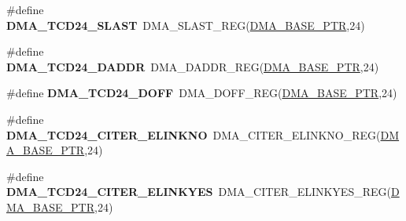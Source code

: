\begin{DoxyCompactItemize}
\item 
\hypertarget{group___d_m_a___register___accessor___macros_ga07c09cae7af5e9d503544a92e534ae4f}{}\#define {\bfseries D\+M\+A\+\_\+\+T\+C\+D24\+\_\+\+S\+L\+A\+S\+T}~D\+M\+A\+\_\+\+S\+L\+A\+S\+T\+\_\+\+R\+E\+G(\hyperlink{group___d_m_a___peripheral_ga6997fbc1b1973e9f27170217a3bd6f22}{D\+M\+A\+\_\+\+B\+A\+S\+E\+\_\+\+P\+T\+R},24)\label{group___d_m_a___register___accessor___macros_ga07c09cae7af5e9d503544a92e534ae4f}

\item 
\hypertarget{group___d_m_a___register___accessor___macros_gad238f6dc2d956a9093c0cf97062d473c}{}\#define {\bfseries D\+M\+A\+\_\+\+T\+C\+D24\+\_\+\+D\+A\+D\+D\+R}~D\+M\+A\+\_\+\+D\+A\+D\+D\+R\+\_\+\+R\+E\+G(\hyperlink{group___d_m_a___peripheral_ga6997fbc1b1973e9f27170217a3bd6f22}{D\+M\+A\+\_\+\+B\+A\+S\+E\+\_\+\+P\+T\+R},24)\label{group___d_m_a___register___accessor___macros_gad238f6dc2d956a9093c0cf97062d473c}

\item 
\hypertarget{group___d_m_a___register___accessor___macros_ga7a62dbbc9e3ac5c19ec1e69d0d47efe7}{}\#define {\bfseries D\+M\+A\+\_\+\+T\+C\+D24\+\_\+\+D\+O\+F\+F}~D\+M\+A\+\_\+\+D\+O\+F\+F\+\_\+\+R\+E\+G(\hyperlink{group___d_m_a___peripheral_ga6997fbc1b1973e9f27170217a3bd6f22}{D\+M\+A\+\_\+\+B\+A\+S\+E\+\_\+\+P\+T\+R},24)\label{group___d_m_a___register___accessor___macros_ga7a62dbbc9e3ac5c19ec1e69d0d47efe7}

\item 
\hypertarget{group___d_m_a___register___accessor___macros_gae4554e5077ad28d574bb069bc1da7f85}{}\#define {\bfseries D\+M\+A\+\_\+\+T\+C\+D24\+\_\+\+C\+I\+T\+E\+R\+\_\+\+E\+L\+I\+N\+K\+N\+O}~D\+M\+A\+\_\+\+C\+I\+T\+E\+R\+\_\+\+E\+L\+I\+N\+K\+N\+O\+\_\+\+R\+E\+G(\hyperlink{group___d_m_a___peripheral_ga6997fbc1b1973e9f27170217a3bd6f22}{D\+M\+A\+\_\+\+B\+A\+S\+E\+\_\+\+P\+T\+R},24)\label{group___d_m_a___register___accessor___macros_gae4554e5077ad28d574bb069bc1da7f85}

\item 
\hypertarget{group___d_m_a___register___accessor___macros_ga88a7054f89a806efff58d69119fbdd4c}{}\#define {\bfseries D\+M\+A\+\_\+\+T\+C\+D24\+\_\+\+C\+I\+T\+E\+R\+\_\+\+E\+L\+I\+N\+K\+Y\+E\+S}~D\+M\+A\+\_\+\+C\+I\+T\+E\+R\+\_\+\+E\+L\+I\+N\+K\+Y\+E\+S\+\_\+\+R\+E\+G(\hyperlink{group___d_m_a___peripheral_ga6997fbc1b1973e9f27170217a3bd6f22}{D\+M\+A\+\_\+\+B\+A\+S\+E\+\_\+\+P\+T\+R},24)\label{group___d_m_a___register___accessor___macros_ga88a7054f89a806efff58d69119fbdd4c}


\end{DoxyCompactItemize}
